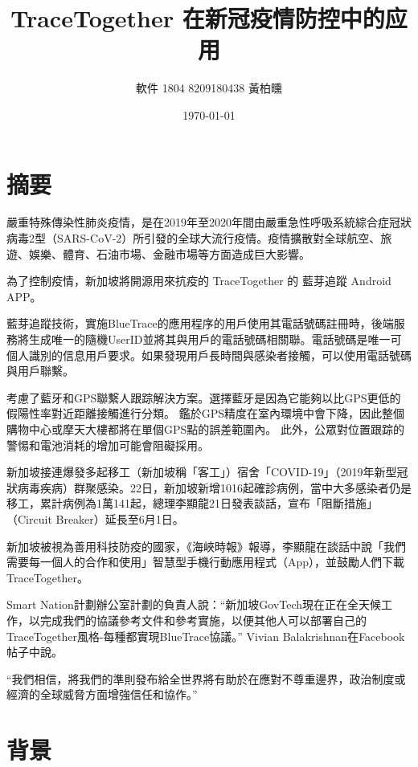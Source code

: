 \documentclass[12pt, a4paper]{report}
\author{軟件 1804 8209180438 黃柏曛}
\date{\today}
\title{TraceTogether 在新冠疫情防控中的应用}
\begin{document}
\maketitle
{}


\part{摘要}

嚴重特殊傳染性肺炎疫情，是在2019年至2020年間由嚴重急性呼吸系統綜合症冠狀病毒2型（SARS-CoV-2）所引發的全球大流行疫情。疫情擴散對全球航空、旅遊、娛樂、體育、石油市場、金融市場等方面造成巨大影響。 

為了控制疫情，新加坡將開源用來抗疫的 TraceTogether 的 藍芽追蹤 Android APP。

藍芽追蹤技術，實施BlueTrace的應用程序的用戶使用其電話號碼註冊時，後端服務將生成唯一的隨機UserID並將其與用戶的電話號碼相關聯。電話號碼是唯一可個人識別的信息用戶要求。如果發現用戶長時間與感染者接觸，可以使用電話號碼與用戶聯繫。

考慮了藍牙和GPS聯繫人跟踪解決方案。選擇藍牙是因為它能夠以比GPS更低的假陽性率對近距離接觸進行分類。 鑑於GPS精度在室內環境中會下降，因此整個購物中心或摩天大樓都將在單個GPS點的誤差範圍內。 此外，公眾對位置跟踪的警惕和電池消耗的增加可能會阻礙採用。

新加坡接連爆發多起移工（新加坡稱「客工」）宿舍「COVID-19」（2019年新型冠狀病毒疾病）群聚感染。22日，新加坡新增1016起確診病例，當中大多感染者仍是移工，累計病例為1萬141起，總理李顯龍21日發表談話，宣布「阻斷措施」（Circuit Breaker）延長至6月1日。

新加坡被視為善用科技防疫的國家，《海峽時報》報導，李顯龍在談話中說「我們需要每一個人的合作和使用」智慧型手機行動應用程式（App），並鼓勵人們下載TraceTogether。

Smart Nation計劃辦公室計劃的負責人說：“新加坡GovTech現在正在全天候工作，以完成我們的協議參考文件和參考實施，以便其他人可以部署自己的TraceTogether風格-每種都實現BlueTrace協議。” Vivian Balakrishnan在Facebook帖子中說。

“我們相信，將我們的準則發布給全世界將有助於在應對不尊重邊界，政治制度或經濟的全球威脅方面增強信任和協作。”

\tableofcontents

\part{背景}
\end{document}
